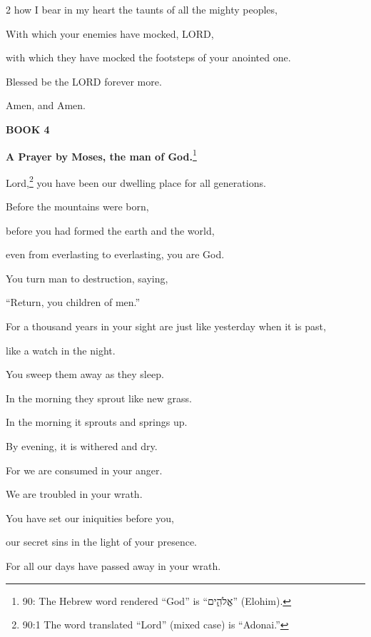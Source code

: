 \begin{multicols}{2}
	how I bear in my heart the taunts of all the mighty peoples,
	
	
	\myverse{}With which your enemies have mocked, LORD,
	
	with which they have mocked the footsteps of your anointed one.
	
	\vspace{\baselineskip}
	
	\myverse{}Blessed be the LORD forever more.
	
	Amen, and Amen.
	
	
			\vspace{\baselineskip}
	\begin{center}
		{\LARGE\textbf{BOOK 4}}
	\end{center}
			\vspace{-\baselineskip}
			
	\mychapter{}\textbf{A Prayer by Moses, the man of God.}\footnote{90: The Hebrew word rendered “God” is “אֱלֹהִ֑ים” (Elohim).}
	
		\quad \myverse*{}Lord,\footnote{90:1 The word translated “Lord” (mixed case) is “Adonai.”} you have been our dwelling place
	for all generations.
	
	
	\myverse{}Before the mountains were born,
	
	before you had formed the earth and the world,
	
	even from everlasting to everlasting, you are God.
	
	
	\myverse{}You turn man to destruction, saying,
	
	“Return, you children of men.”
	
	
	\myverse{}For a thousand years in your sight are just like yesterday when
	it is past,
	
	like a watch in the night.
	
	
	\myverse{}You sweep them away as they sleep.
	
	In the morning they sprout like new grass.
	
	
	\myverse{}In the morning it sprouts and springs up.
	
	By evening, it is withered and dry.
	
	
	\myverse{}For we are consumed in your anger.
	
	We are troubled in your wrath.
	
	
	\myverse{}You have set our iniquities before you,
	
	our secret sins in the light of your presence.
	
	
	\myverse{}For all our days have passed away in your wrath.
	

\end{multicols}
